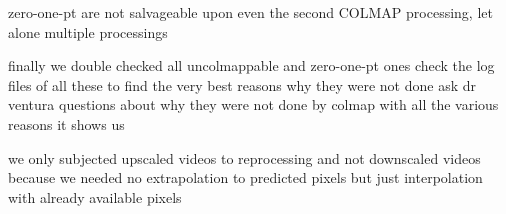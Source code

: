 zero-one-pt are not salvageable upon even the second COLMAP processing, let alone multiple processings

finally we double checked all uncolmappable and zero-one-pt ones
check the log files of all these to find the very best reasons why they were not done
ask dr ventura questions about why they were not done by colmap with all the various reasons it shows us

we only subjected upscaled videos to reprocessing and not downscaled videos because we needed no extrapolation to predicted pixels but just interpolation with already available pixels  